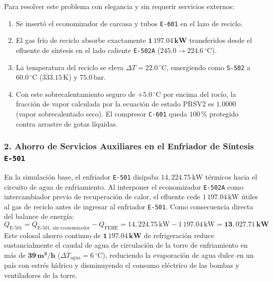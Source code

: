 \documentclass[11pt,a4paper]{article}
\begin{document}
Para resolver este problema con elegancia y sin requerir servicios externos:
\begin{enumerate}
    \item Se insertó el economizador de carcasa y tubos \texttt{E-601} en el lazo de reciclo.
    \item El gas frío de reciclo absorbe exactamente $\mathbf{1\,197.04\,\text{kW}}$ transferidos desde el efluente de síntesis en el lado caliente \texttt{E-502A} ($245.0 \to 224.6\,^\circ\text{C}$).
    \item La temperatura del reciclo se eleva $\Delta T = 22.0\,^\circ\text{C}$, emergiendo como \texttt{S-502} a \textbf{$60.0\,^\circ\text{C}$} ($333.15\,\text{K}$) y $75.0\,\text{bar}$.
    \item Con este sobrecalentamiento seguro de $+5.0\,^\circ\text{C}$ por encima del rocío, la fracción de vapor calculada por la ecuación de estado PRSV2 es $1.0000$ (vapor sobrecalentado seco). El compresor \texttt{C-601} queda $100\,\%$ protegido contra arrastre de gotas líquidas.
\end{enumerate}

\subsubsection{2. Ahorro de Servicios Auxiliares en el Enfriador de Síntesis \texttt{E-501}}
En la simulación base, el enfriador \texttt{E-501} disipaba $14{,}224.75\,\text{kW}$ térmicos hacia el circuito de agua de enfriamiento.
Al interponer el economizador \texttt{E-502A} como intercambiador previo de recuperación de calor, el efluente cede $1\,197.04\,\text{kW}$ útiles al gas de reciclo antes de ingresar al enfriador \texttt{E-501}. Como consecuencia directa del balance de energía:
\begin{equation}
    Q_{\text{E-501}} = Q_{\text{E-501, sin economizador}} - Q_{\text{FEHE}} = 14{,}224.75\,\text{kW} - 1\,197.04\,\text{kW} = \mathbf{13{,}027.71\,\text{kW}}
\end{equation}
Este colosal ahorro continuo de $\mathbf{1\,197.04\,\text{kW}}$ de refrigeración reduce sustancialmente el caudal de agua de circulación de la torre de enfriamiento en más de $\mathbf{39\,\text{m}^3\text{/h}}$ ($\Delta T_{\text{agua}} = 6\,^\circ\text{C}$), reduciendo la evaporación de agua dulce en un país con estrés hídrico y disminuyendo el consumo eléctrico de las bombas y ventiladores de la torre.
\end{document}
